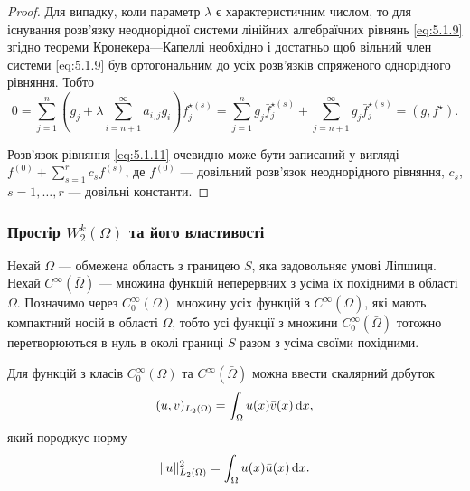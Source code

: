 \begin{proof}
    Для випадку, коли параметр $\lambda$ є характеристичним числом, то для існування розв'язку неоднорідної системи лінійних алгебраїчних рівнянь \eqref{eq:5.1.9} згідно теореми Кронекера---Капеллі необхідно і достатньо щоб вільний член системи \eqref{eq:5.1.9} був ортогональним до усіх роз\-в'яз\-ків спряженого однорідного рівняння. Тобто
    \begin{equation}
        \label{eq:5.1.13}
        0 = \sum_{j = 1}^n \left( g_j + \lambda \sum_{i = n + 1}^\infty a_{i, j} g_i \right) f_j^{\star(s)} = \sum_{j = 1}^n g_j \bar f_j^{\star (s)} + \sum_{j = n + 1}^\infty g_j \bar f_j^{\star(s)} = (g, f^\star).
    \end{equation}

    Розв'язок рівняння \eqref{eq:5.1.11} очевидно може бути записаний у вигляді $f^{(0)} + \sum_{s = 1}^r c_s f^{(s)}$, де $f^{(0)}$ --- довільний розв’язок неоднорідного рівняння, $c_s$, $s = 1, \ldots, r$ --- довільні константи.
\end{proof}

\subsubsection{Простір \texorpdfstring{$W_2^k(\Omega)$}{W\_2\^k(Omega)} та його властивості}

Нехай $\Omega$ --- обмежена область з границею $S$, яка задовольняє умові Ліпшиця. Нехай $C^\infty(\bar \Omega)$ --- %
множина функцій неперервних з усіма їх похідними в області $\bar \Omega$. Позначимо через $C_0^\infty(\Omega)$ %
множину усіх функцій з $C^\infty(\bar \Omega)$, які мають компактний носій в області $\Omega$, тобто усі функції з множини $C_0^\infty (\bar \Omega)$ тотожно перетворюються в нуль в околі границі $S$ разом з усіма своїми похідними. \medskip

\begin{proposition}
    Для функцій з класів $C_0^\infty(\Omega)$ та $C^\infty(\bar \Omega)$ можна ввести скалярний добуток
    \begin{equation*}
        (u, v)_{L_2(\Omega)} = \int_\Omega u(x) \bar v(x) \mathop{}\!\mathrm{d} x,
    \end{equation*}
    який породжує норму
    \begin{equation*}
        \|u\|_{L_2(\Omega)}^2 = \int_\Omega u(x) \bar u(x) \mathop{}\!\mathrm{d} x.
    \end{equation*}
\end{proposition}

